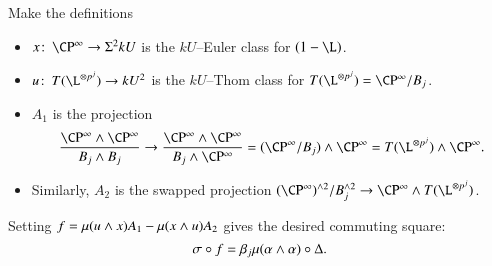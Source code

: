 \begin{lemma}
Make the definitions
\begin{itemize}
\item $x\co \CP^\infty \to \Susp^2 kU$ is the $kU$--Euler class for $(1 - \L)$.
\item $u\co T(\L^{\otimes p^j}) \to kU^2$ is the $kU$--Thom class for $T(\L^{\otimes p^j}) = \CP^\infty / B_j$.
\item $A_1$ is the projection \[\frac{\CP^\infty \sm \CP^\infty}{B_j \sm B_j} \to \frac{\CP^\infty \sm \CP^\infty}{B_j \sm \CP^\infty} = (\CP^\infty / B_j) \sm \CP^\infty = T(\L^{\otimes p^j}) \sm \CP^\infty.\]
\item Similarly, $A_2$ is the swapped projection $(\CP^\infty)^{\sm 2} / B_j^{\sm 2} \to \CP^\infty \sm T(\L^{\otimes p^j})$.
\end{itemize}
Setting $f = \mu(u \wedge x) A_1 - \mu(x \wedge u) A_2$ gives the desired commuting square: \[\sigma \circ f = \beta_j \mu(\alpha \wedge \alpha) \circ \Delta.\]
\end{lemma}
